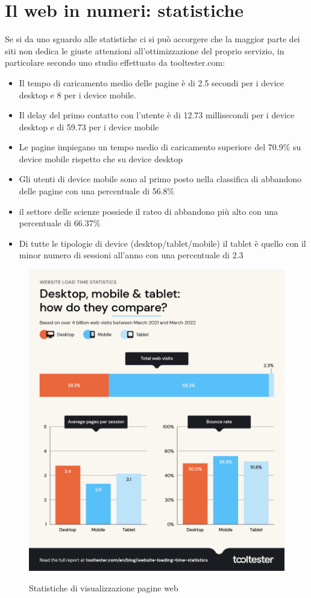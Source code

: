 \section{Il web in numeri: statistiche}
Se si da uno sguardo alle statistiche ci si può accorgere che la maggior parte dei siti non dedica le giuste attenzioni all'ottimizzazione del proprio servizio, in particolare secondo uno studio effettuato da tooltester.com:
\begin{itemize}
    \item Il tempo di caricamento medio delle pagine è di 2.5 secondi per i device desktop e 8 per i device mobile.
    \item Il delay del primo contatto con l'utente è di 12.73 millisecondi per i device desktop e di 59.73 per i device mobile
    \item Le pagine  impiegano un tempo medio di caricamento superiore del 70.9\% su device mobile rispetto che su device desktop
    \item Gli utenti di device mobile sono al primo posto nella classifica di abbandono delle pagine con una percentuale di 56.8\% 
    \item il settore delle scienze possiede il rateo di abbandono più alto con una percentuale di 66.37\%
    \item Di tutte le tipologie di device (desktop/tablet/mobile) il tablet è quello con il minor numero di sessioni all'anno con una percentuale di 2.3%
\end{itemize}
\begin{figure}[H]
   \centering
   \includegraphics[scale=0.25]{resources/website-load-time-statistics-desktop-mobile-tablet.png}
\cite{website-loading-time-statistics}
\caption{Statistiche di visualizzazione pagine web}
\end{figure}


   